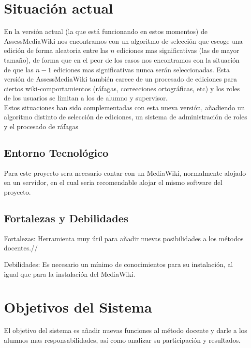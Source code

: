 


\section{Situación actual} 
En la versión actual (la que está funcionando en estos momentos) de AssessMediaWiki nos encontramos con un algoritmo de selección que escoge una edición de forma aleatoria entre las $n$ ediciones mas significativas (las de mayor tamaño), de forma que en el peor de los casos nos encontramos con la situación de que las $n-1$ ediciones mas significativas nunca serán seleccionadas.
\newline
Esta versión de AssessMediaWiki también carece de un procesado de ediciones para ciertos wiki-comportamientos (ráfagas, correcciones ortográficas, etc) y los roles de los usuarios se limitan a los de alumno y supervisor.\\
Estos situaciones han sido complementadas con esta nueva versión, añadiendo un algoritmo distinto de selección de ediciones, un sistema de administración de roles y el procesado de ráfagas

\subsection{Entorno Tecnológico}
Para este proyecto sera necesario contar con un MediaWiki, normalmente alojado en un servidor, en el cual seria recomendable alojar el mismo software del proyecto.

\subsection{Fortalezas y Debilidades}
Fortalezas: Herramienta muy útil para añadir nuevas posibilidades a los métodos docentes.//

Debilidades: Es necesario un mínimo de conocimientos para su instalación, al igual que para la instalación del MediaWiki.

\section{Objetivos del Sistema}
El objetivo del sistema es añadir nuevas funciones al método docente y darle a los alumnos mas responsabilidades, así como analizar su participación y resultados.

